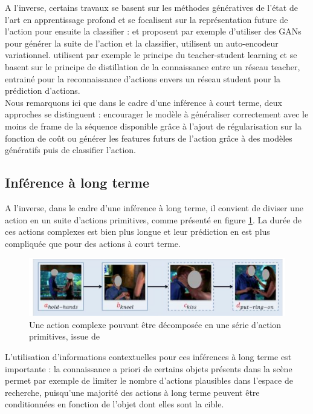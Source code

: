 A l'inverse, certains travaux se basent sur les méthodes génératives de l'état de l'art en apprentissage profond et se focalisent sur la représentation future de l'action pour ensuite la classifier :
\cite{2019arXiv191207148G} et \cite{xu2019prediction} proposent par exemple d'utiliser des GANs \cite{2014arXiv1406.2661G} pour générer la suite de l'action et la classifier,\cite{runsheng2017predictive} utilisent un auto-encodeur variationnel. 
\cite{wang2019progressive} utilisent par exemple le principe du teacher-student learning et se basent sur le principe de distillation de la connaissance entre un réseau teacher, entrainé pour la reconnaissance d'actions envers un réseau student pour la prédiction d'actions.\\

Nous remarquons ici que dans le cadre d'une inférence à court terme, deux approches se distinguent : encourager le modèle à généraliser correctement avec le moins de frame de la séquence disponible grâce à l'ajout de régularisation sur la fonction de coût ou générer les features futurs de l'action grâce à des modèles génératifs puis de classifier l'action.


\subsection{Inférence à long terme}
A l'inverse, dans le cadre d'une inférence à long terme, il convient de diviser une action en un suite d'actions primitives, comme présenté en figure \ref{fig:47}.
La durée de ces actions complexes est bien plus longue et leur prédiction en est plus compliquée que pour des actions à court terme.
\begin{figure}[H]
    \centering
    \includegraphics[width=0.7\linewidth]{Images/47.png}
    \caption{Une action complexe pouvant être décomposée en une série d'action primitives, issue de \cite{li2014prediction}}
    \label{fig:47}
\end{figure}

 L'utilisation d'informations contextuelles pour ces inférences à long terme est importante : la connaissance a priori de certains objets présents dans la scène permet par exemple de limiter le nombre d'actions plausibles dans l'espace de recherche, puisqu'une majorité des actions à long terme peuvent être conditionnées en fonction de l'objet dont elles sont la cible.\\
 
